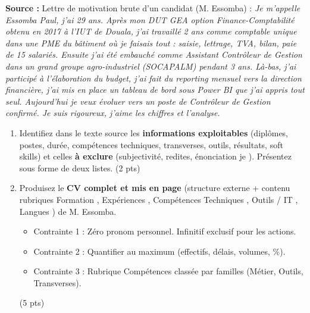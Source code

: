 \documentclass[11pt]{article}
\begin{document}
\begin{exercice}
\textbf{Source :} Lettre de motivation brute d'un candidat (M. Essomba) : \og \textit{Je m'appelle Essomba Paul, j'ai 29 ans. Après mon DUT GEA option Finance-Comptabilité obtenu en 2017 à l'IUT de Douala, j'ai travaillé 2 ans comme comptable unique dans une PME du bâtiment où je faisais tout : saisie, lettrage, TVA, bilan, paie de 15 salariés. Ensuite j'ai été embauché comme Assistant Contrôleur de Gestion dans un grand groupe agro-industriel (SOCAPALM) pendant 3 ans. Là-bas, j'ai participé à l'élaboration du budget, j'ai fait du reporting mensuel vers la direction financière, j'ai mis en place un tableau de bord sous Power BI que j'ai appris tout seul. Aujourd'hui je veux évoluer vers un poste de Contrôleur de Gestion confirmé. Je suis rigoureux, j'aime les chiffres et l'analyse.} \fg{}

\begin{enumerate}
    \item Identifiez dans le texte source les \textbf{informations exploitables} (diplômes, postes, durée, compétences techniques, transverses, outils, résultats, soft skills) et celles \textbf{à exclure} (subjectivité, redites, énonciation \og je \fg{}). Présentez sous forme de deux listes. (2 pts)
    \item Produisez le \textbf{CV complet et mis en page} (structure externe + contenu rubriques \og Formation \fg{}, \og Expériences \fg{}, \og Compétences Techniques \fg{}, \og Outils / IT \fg{}, \og Langues \fg{}) de M. Essomba.
    \begin{itemize}
        \item Contrainte 1 : Zéro pronom personnel. Infinitif exclusif pour les actions.
        \item Contrainte 2 : Quantifier au maximum (effectifs, délais, volumes, \%).
        \item Contrainte 3 : Rubrique \og Compétences \fg{} classée par familles (Métier, Outils, Transverses).
    \end{itemize}
    (5 pts)
\end{enumerate}
\end{exercice}
\end{document}
